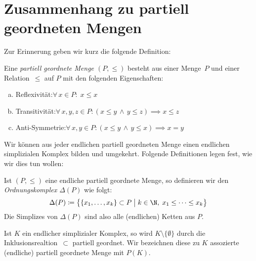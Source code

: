 \section{Zusammenhang zu partiell geordneten Mengen}
Zur Erinnerung geben wir kurz die folgende Definition:

\begin{thDef}
    Eine \emph{partiell geordnete Menge $(P,\leq)$} besteht aus einer Menge~$P$
    und einer Relation~$\leq$ auf $P$ mit den folgenden Eigenschaften:
    \begin{enumerate}[a)]
        \item
            Reflexivität:\quad $\forall\, x\in P\colon\; x \leq x$
        \item
            Transitivität:\quad $\forall\, x,y,z\in P\colon 
            (x\leq y \,\wedge\, y\leq z) \implies x \leq z$
        \item
            Anti-Symmetrie:\quad $\forall\, x,y\in P\colon
            (x\leq y \,\wedge\, y\leq x) \implies x = y$
    \end{enumerate}
\end{thDef}

Wir können aus jeder endlichen partiell geordneten Menge einen endlichen 
simplizialen Komplex bilden und umgekehrt.
Folgende Definitionen legen fest, wie wir dies tun wollen:

\begin{thDef}[Ordnungskomplex]
    Ist $(P,\leq)$ eine endliche partiell geordnete Menge, so definieren wir den
    \emph{Ordnungskomplex $\Delta(P)$} wie folgt:
    \[ \Delta(P) \defeq \bigl\{ \{x_1,\ldots,x_k\} \subset P \cMid[\;]\big 
        k\in\N,\; x_1\leq \dots \leq x_k \bigr\}
    \]
    Die Simplizes von $\Delta(P)$ sind also alle (endlichen) Ketten aus $P$.
\end{thDef}

\begin{thDef}
    Ist $K$ ein endlicher simplizialer Komplex, so wird
    $K\setminus\{\emptyset\}$ durch die Inklusionsrealtion~$\subset$ partiell
    geordnet. Wir bezeichnen diese zu $K$ assozierte (endliche) 
    partiell geordnete Menge mit $P(K)$.
\end{thDef}


